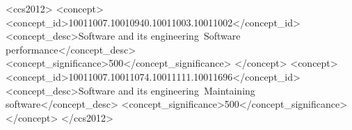 \documentclass[sigconf]{acmart}
\begin{document}
%
%
\begin{CCSXML}
<ccs2012>
<concept>
<concept_id>10011007.10010940.10011003.10011002</concept_id>
<concept_desc>Software and its engineering~Software performance</concept_desc>
<concept_significance>500</concept_significance>
</concept>
<concept>
<concept_id>10011007.10011074.10011111.10011696</concept_id>
<concept_desc>Software and its engineering~Maintaining software</concept_desc>
<concept_significance>500</concept_significance>
</concept>
</ccs2012>
\end{CCSXML}



\pagestyle{plain} %

\maketitle

%





















\newpage


 
\end{document}
